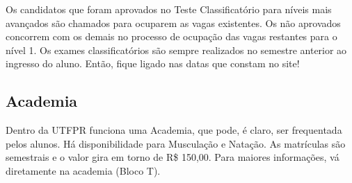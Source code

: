 \documentclass[a4paper,12pt,openany]{article}
\begin{document}
Os candidatos que foram aprovados no Teste Classificatório para níveis mais avançados são chamados para ocuparem as vagas existentes. Os não aprovados concorrem com os demais no processo de ocupação das vagas restantes para o nível 1. Os exames classificatórios são sempre realizados no semestre anterior ao ingresso do aluno. Então, fique ligado nas datas que constam no site!



\subsection{Academia}

Dentro da UTFPR funciona uma Academia, que pode, é claro, ser frequentada pelos alunos. Há disponibilidade para Musculação e Natação. As matrículas são semestrais e o valor gira em torno de R\$ 150,00. Para maiores informações, vá diretamente na academia (Bloco T).





\end{document}
